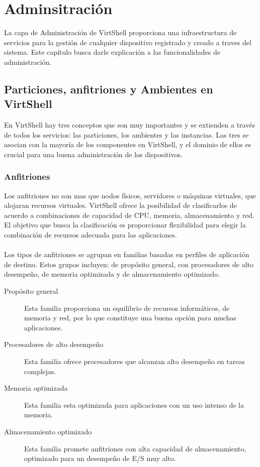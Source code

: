 \chapter{Adminsitración}
\label{capadministracion}

La capa de Administración de VirtShell proporciona una infraestructura de servicios para la gestión de cualquier dispositivo registrado y creado a traves del sistema. Este capítulo busca darle explicación a las funcionalidades de administración.

\section{Particiones, anfitriones y Ambientes en VirtShell}
En VirtShell hay tres conceptos que son muy importantes y se extienden a través de todos los servicios: las particiones, los ambientes y las instancias. Las tres se asocian con la mayoría de los componentes en VirtShell, y el dominio de ellos es crucial para una buena administración de los dispositivos. 

\subsection{Anfitriones}
Los anfitriones no son mas que nodos físicos, servidores o máquinas virtuales, que alojaran recursos virtuales. VirtShell ofrece la posibilidad de clasificarlos de acuerdo a combinaciones de capacidad de CPU, memoria, almacenamiento y red. El objetivo que busca la clasificación es proporcionar flexibilidad para elegir la combinación de recursos adecuada para las aplicaciones.\\
\\
Los tipos de anfitriones se agrupan en familias basadas en perfiles de aplicación de destino. Estos grupos incluyen: de propósito general, con procesadores de alto desempeño, de memoria optimizada y de almacenamiento optimizado.

\begin{description}
\item [Propósito general] Esta familia proporciona un equilibrio de recursos informáticos, de memoria y red, por lo que constituye una buena opción para muchas aplicaciones.
\item [Procesadores de alto desempeño] Esta familia ofrece procesadores que alcanzan alto desempeño en tareas complejas.
\item [Memoria optimizada] Esta familia esta optimizada para aplicaciones con un uso intenso de la memoria.
\item [Almacenamiento optimizado] Esta familia promete anfitriones con alta capacidad de almacenamiento, optimizado para un desempeño de E/S muy alto.
\end{description}

